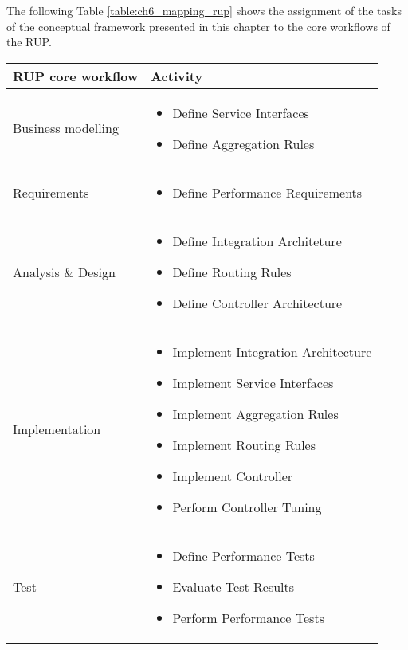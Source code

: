 The following Table \ref{table:ch6_mapping_rup} shows the assignment of the tasks of the conceptual framework presented in this chapter to the core workflows of the \ac{RUP}.

	\begin{tabularx}{\textwidth}{@{} l X @{}}
		\caption{Mapping of tasks to \acs{RUP} core workflows} \label{table:ch6_mapping_rup}\\
		\toprule
		\bfseries \ac{RUP} core workflow & \bfseries Activity\\
		\midrule
		Business modelling & 
		\begin{itemize}
			\item Define Service Interfaces
			\item Define Aggregation Rules
		\end{itemize}
		\\
		\midrule
		Requirements & 
		\begin{itemize}
			\item Define Performance Requirements
		\end{itemize}
		\\
		\midrule
		Analysis \& Design &
		\begin{itemize}
			\item Define Integration Architeture
			\item Define Routing Rules
			\item Define Controller Architecture
		\end{itemize}
		\\
		\midrule
		Implementation &
		\begin{itemize}
			\item Implement Integration Architecture
			\item Implement Service Interfaces
			\item Implement Aggregation Rules
			\item Implement Routing Rules
			\item Implement Controller
			\item Perform Controller Tuning
		\end{itemize}
		\\
		\midrule
		Test & 
		\begin{itemize}
			\item Define Performance Tests
			\item Evaluate Test Results
			\item Perform Performance Tests
		\end{itemize}
		\\

\end{tabularx}
